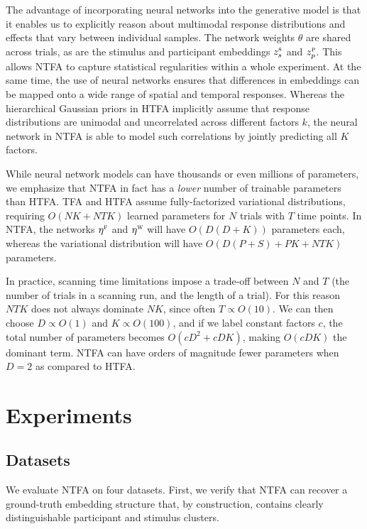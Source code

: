 \documentclass[twoside]{article}
\newcommand{\scf}{\textsc{f}}
\newcommand{\scw}{\textsc{w}}
\newcommand{\scp}{\textsc{p}}
\newcommand{\scs}{\textsc{s}}
\begin{document}
The advantage of incorporating neural networks into the generative model is that it enables us to explicitly reason about multimodal response distributions and effects that vary between individual samples.  The network weights $\theta$ are shared across trials, as are the stimulus and participant embeddings $z^\scs_s$ and $z^\scp_p$. This allows NTFA to capture statistical regularities within a whole experiment.  At the same time, the use of neural networks ensures that differences in embeddings can be mapped onto a wide range of spatial and temporal responses.  Whereas the hierarchical Gaussian priors in HTFA implicitly assume that response distributions are unimodal and uncorrelated across different factors $k$, the neural network in NTFA is able to model such correlations by jointly predicting all $K$ factors.

While neural network models can have thousands or even millions of parameters, we emphasize that  NTFA in fact has a \emph{lower} number of trainable parameters than HTFA.  TFA and HTFA assume fully-factorized variational distributions, requiring $O(NK+NTK)$ learned parameters for $N$ trials with $T$ time points. In NTFA, the networks $\eta^\scf$ and $\eta^\scw$ will have $O(D(D+K))$ parameters each, whereas the variational distribution will have $O(D(P+S)+PK+NTK)$ parameters.

In practice, scanning time limitations impose a trade-off between $N$ and $T$ (the number of trials in a scanning run, and the length of a trial). For this reason $NTK$ does not always dominate $NK$, since often $T\propto O(10)$.  We can then choose $D\propto O(1)$ and $K \propto O(100)$, and if we label constant factors $c$, the total number of parameters becomes $O(cD^2 + cDK)$, making $O(cDK)$ the dominant term.  NTFA can have orders of magnitude fewer parameters when $D=2$ as compared to HTFA.

\vspace{-1.0em}
\section{Experiments}
\vspace{-1em}
\label{sec:experiments}

\subsection{Datasets}
\vspace{-1em}
\label{subsec:datasets}

We evaluate NTFA on four datasets. First, we verify that NTFA can recover a ground-truth embedding structure that, by construction, contains clearly distinguishable participant and stimulus clusters.
\end{document}
